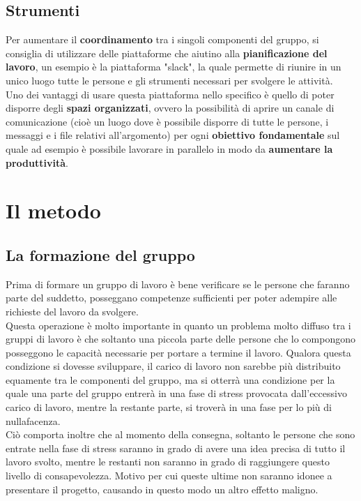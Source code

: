 \documentclass[11pt,a4paper]{article}
\begin{document}
	\subsection{Strumenti}
	Per aumentare il \textbf{coordinamento} tra i singoli componenti del gruppo, si consiglia di utilizzare delle piattaforme che aiutino alla \textbf{pianificazione del lavoro}, un esempio è la piattaforma "slack", la quale permette di riunire in un unico luogo tutte le persone e gli strumenti necessari per svolgere le attività.\\
	Uno dei vantaggi di usare questa piattaforma nello specifico è quello di poter disporre degli \textbf{spazi organizzati}, ovvero la possibilità di aprire un canale di comunicazione (cioè un luogo dove è possibile disporre di tutte le persone, i messaggi e i file relativi all'argomento) per ogni \textbf{obiettivo fondamentale} sul quale ad esempio è possibile lavorare in parallelo in modo da \textbf{aumentare la produttività}. 
	\newpage
	
	\section{Il metodo}
	\subsection{La formazione del gruppo}
	Prima di formare un gruppo di lavoro è bene verificare se le persone che faranno parte del suddetto, posseggano competenze sufficienti per poter adempire alle richieste del lavoro da svolgere.\\
	Questa operazione è molto importante in quanto un problema molto diffuso tra i gruppi di lavoro è che soltanto una piccola parte delle persone che lo compongono posseggono le capacità necessarie per portare a termine il lavoro. Qualora questa condizione si dovesse sviluppare, il carico di lavoro non sarebbe più distribuito equamente tra le componenti del gruppo, ma si otterrà una condizione per la quale una parte del gruppo entrerà in una fase di stress provocata dall'eccessivo carico di lavoro, mentre la restante parte, si troverà in una fase per lo più di nullafacenza.\\
	Ciò comporta inoltre che al momento della consegna, soltanto le persone che sono entrate nella fase di stress saranno in grado di avere una idea precisa di tutto il lavoro svolto, mentre le restanti non saranno in grado di raggiungere questo livello di consapevolezza. Motivo per cui  queste ultime non saranno idonee a presentare il progetto, causando in questo modo un altro effetto maligno.\\
	
\end{document}
